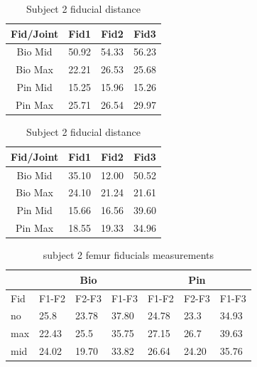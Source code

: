 \begin{table}
\begin{subtable}[c]{0.5\textwidth}
    \centering
        \begin{tabular}{||c | c c c||} 
         \hline
          Fid/Joint & Fid1 & Fid2 & Fid3  \\ [0.5ex] 
         \hline\hline
         Bio Mid & 50.92 & 54.33 & 56.23 \\ 
         \hline
         Bio Max & 22.21 & 26.53 & 25.68 \\
         \hline
         Pin Mid & 15.25 & 15.96 & 15.26 \\
         \hline
         Pin Max & 25.71 & 26.54 & 29.97 \\ [1ex] 
         \hline
        \end{tabular}
    \end{subtable}
   \begin{subtable}[c]{0.5\textwidth}
   \centering
    \begin{tabular}{||c | c c c||} 
         \hline
         Fid/Joint & Fid1 & Fid2 & Fid3  \\ [0.5ex] 
         \hline\hline
         Bio Mid & 35.10 & 12.00 & 50.52 \\ 
         \hline
         Bio Max & 24.10 & 21.24 & 21.61 \\
         \hline
         Pin Mid & 15.66 & 16.56 & 39.60 \\
         \hline
         Pin Max & 18.55 & 19.33 & 34.96 \\ [1ex] 
         \hline
        \end{tabular}
    \end{subtable}
\caption{Subject 2 fiducial distance}
\label{tab:sub2MRI}
\end{table}


\begin{table}[]
\centering
\begin{tabular}{ll|lll|lll|}
\cline{3-8}
       &       & \multicolumn{3}{c|}{Bio}   & \multicolumn{3}{c|}{Pin}   \\ \hline
\multicolumn{2}{|l|}{Fid} & \multicolumn{1}{l|}{F1-F2} & \multicolumn{1}{l|}{F2-F3} & F1-F3 & \multicolumn{1}{l|}{F1-F2} & \multicolumn{1}{l|}{F2-F3} & F1-F3 \\ \hline
\multicolumn{2}{|l|}{no}  & \multicolumn{1}{l|}{25.8}      & \multicolumn{1}{l|}{23.78}     & 37.80     & \multicolumn{1}{l|}{24.78}     & \multicolumn{1}{l|}{23.3}      & 34.93     \\ \hline
\multicolumn{2}{|l|}{max} & \multicolumn{1}{l|}{22.43}     & \multicolumn{1}{l|}{25.5}      & 35.75     & \multicolumn{1}{l|}{27.15}     & \multicolumn{1}{l|}{26.7}      & 39.63     \\ \hline
\multicolumn{2}{|l|}{mid} & \multicolumn{1}{l|}{24.02}     & \multicolumn{1}{l|}{19.70}     & 33.82     & \multicolumn{1}{l|}{26.64}     & \multicolumn{1}{l|}{24.20}     & 35.76     \\ \hline
\end{tabular}
\caption{subject 2 femur fiducials measurements}
\label{tab:sub2_femur}
\end{table}


